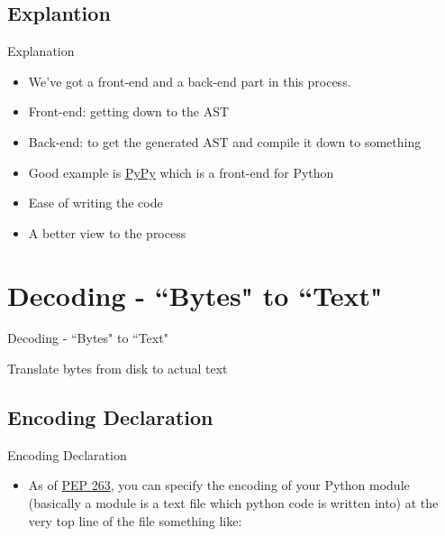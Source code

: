 \documentclass[aspectratio=169, dvipsnames, svgnames, x11names]{beamer}
\begin{document}
\subsection{Explantion}
\begin{frame}{Explanation}
\begin{itemize}
\item[-]<1->
We’ve got a front-end and a back-end part in this process.

\item[-]<2->
Front-end: getting down to the AST

\item[-]<3->
Back-end: to get the generated AST and compile it down to something

\item[-]<4->
Good example is \href{https://www.pypy.org/}{PyPy} which is a front-end for Python

\item[-]<5->
Ease of writing the code

\item[-]<6->
A better view to the process
\end{itemize}
\end{frame}

\section{Decoding - ``Bytes" to ``Text"}
\begin{frame}{Decoding - ``Bytes" to ``Text"}
\begin{itemize}
{\LARGE \item[-] Translate bytes from disk to actual text}
\end{itemize}
\end{frame}

\subsection{Encoding Declaration}
\begin{frame}{Encoding Declaration}
\begin{itemize}
\item[-] As of \href{https://peps.python.org/pep-0263/}{PEP 263}, you can specify the encoding of your Python module (basically a module is a text
file which python code is written into) at the very top line of the file something like:
\end{itemize}
\end{frame}
\end{document}
